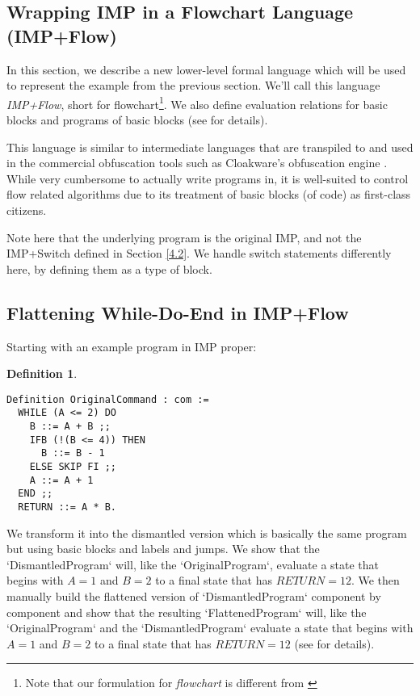 \documentclass[compsoc,conference,a4paper,10pt,times]{IEEEtran}
\newtheorem{defin}[theorem]{Definition}
\begin{document}
\subsection{Wrapping IMP in a Flowchart Language (IMP+Flow)}

In this section, we describe a new lower-level formal language which will be used to represent the example from the previous section.  We'll call this language \emph{IMP+Flow}, short for flowchart\footnote{Note that our formulation for \emph{flowchart} is different from \cite{SFV2}}. We also define evaluation relations for basic blocks and programs of basic blocks (see \cite{Weyun} for details).

\par This language is similar to intermediate languages that are transpiled to and used in the commercial obfuscation tools such as Cloakware's obfuscation engine \cite{Cloakware}. While very cumbersome to actually write programs in, it is well-suited to control flow related algorithms due to its treatment of basic blocks (of code) as first-class citizens.

\par Note here that the underlying program is the original IMP, and not the IMP+Switch defined in Section \ref{4.2}.  We handle switch statements differently here, by defining them as a type of block.

\subsection{Flattening While-Do-End in IMP+Flow}

Starting with an example program in IMP proper:

\begin{defin}
    
    \begin{verbatim}
Definition OriginalCommand : com :=
  WHILE (A <= 2) DO
    B ::= A + B ;;
    IFB (!(B <= 4)) THEN
      B ::= B - 1
    ELSE SKIP FI ;;
    A ::= A + 1
  END ;;
  RETURN ::= A * B.
  \end{verbatim}
  \end{defin}

We transform it into the dismantled version which is basically the same program but using basic blocks and labels and jumps. We show that the `DismantledProgram` will, like the `OriginalProgram`, evaluate a state that begins with $A = 1$ and $B = 2$ to a final state that has $RETURN = 12$. We then manually build the flattened version of `DismantledProgram` component by component and show that the resulting `FlattenedProgram` will, like the `OriginalProgram` and the `DismantledProgram` evaluate a state that begins with $A = 1$ and $B = 2$ to a final state that has $RETURN = 12$ (see \cite{Weyun} for details).
\end{document}
